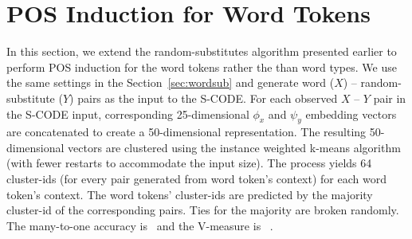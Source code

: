 \section{POS Induction for Word Tokens}
\label{sec:tokens}

In this section, we extend the random-substitutes algorithm presented
earlier to perform POS induction for the word tokens rather the than
word types.  We use the same settings in the Section~\ref{sec:wordsub}
and generate word ($X$) -- random-substitute ($Y$) pairs as the input
to the S-CODE.  For each observed $X$ -- $Y$ pair in the S-CODE input,
corresponding 25-dimensional $\phi_x$ and $\psi_y$ embedding vectors
are concatenated to create a 50-dimensional representation.  The
resulting 50-dimensional vectors are clustered using the instance
weighted k-means algorithm (with fewer restarts to accommodate the
input size).  The process yields 64 cluster-ids (for every pair
generated from word token's context) for each word token's context.
The word tokens' cluster-ids are predicted by the majority cluster-id
of the corresponding pairs.  Ties for the majority are broken
randomly.  The many-to-one accuracy is \wsxymto\ and the V-measure is
\wsxyvm\ .

